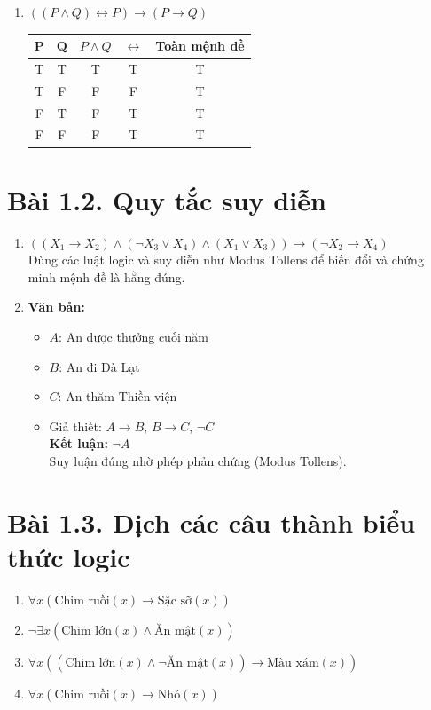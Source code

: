 \documentclass[12pt]{article}
\begin{document}
\begin{enumerate}[label=\alph*)]
    \item $((P \land Q) \leftrightarrow P) \rightarrow (P \rightarrow Q)$\\
    \begin{tabular}{|c|c|c|c|c|}
        \hline
        P & Q & $P \land Q$ & $\leftrightarrow$ & Toàn mệnh đề \\
        \hline
        T & T & T & T & T \\
        T & F & F & F & T \\
        F & T & F & T & T \\
        F & F & F & T & T \\
        \hline
    \end{tabular}
\end{enumerate}

\section*{Bài 1.2. Quy tắc suy diễn}
\begin{enumerate}[label=\alph*)]
    \item $((X_1 \rightarrow X_2) \land (\neg X_3 \lor X_4) \land (X_1 \lor X_3)) \rightarrow (\neg X_2 \rightarrow X_4)$\\
    Dùng các luật logic và suy diễn như Modus Tollens để biến đổi và chứng minh mệnh đề là hằng đúng.

    \item \textbf{Văn bản:}\\
    \begin{itemize}
        \item $A$: An được thưởng cuối năm
        \item $B$: An đi Đà Lạt
        \item $C$: An thăm Thiền viện
        \item Giả thiết: $A \rightarrow B$, $B \rightarrow C$, $\neg C$\\
        \textbf{Kết luận:} $\neg A$\\
        Suy luận đúng nhờ phép phản chứng (Modus Tollens).
    \end{itemize}
\end{enumerate}

\section*{Bài 1.3. Dịch các câu thành biểu thức logic}
\begin{enumerate}[label=\alph*)]
    \item $\forall x (\text{Chim ruồi}(x) \rightarrow \text{Sặc sỡ}(x))$
    \item $\neg \exists x (\text{Chim lớn}(x) \land \text{Ăn mật}(x))$
    \item $\forall x ((\text{Chim lớn}(x) \land \neg \text{Ăn mật}(x)) \rightarrow \text{Màu xám}(x))$
    \item $\forall x (\text{Chim ruồi}(x) \rightarrow \text{Nhỏ}(x))$
\end{enumerate}
\end{document}
